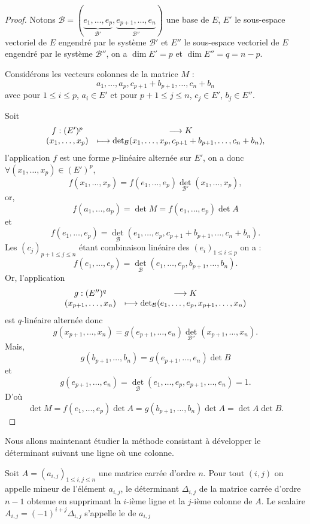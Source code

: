 \documentclass[class=report,crop=false]{standalone}
\begin{document}
\begin{proof}
Notons $\mathcal{B}=(\underbrace{e_1,\dots,e_p}_{\mathcal{B}'},\underbrace{e_{p+1},\dots,e_n}_{\mathcal{B}''})$ une base de $E$, $E'$ le sous-espace vectoriel de $E$ engendré par le système $\mathcal{B}'$ et $E''$ le sous-espace vectoriel de $E$ engendré par le système $\mathcal{B}''$, on a $\dim E'=p$ et $\dim E''=q=n-p$.

Considérons les vecteurs colonnes de la matrice $M$ :
$$a_1,\dots,a_p,c_{p+1}+b_{p+1},\dots,c_n+b_n$$ 
avec pour $1\leq i\leq p$, $a_i\in E'$ et pour $p+1\leq j\leq n$, $c_j\in E'$, $b_j\in E''$.

Soit $$\begin{array}{cc}f:(E')^p&\longrightarrow K\cr (x_1,\dots,x_p)&\longmapsto\det_\mathcal{B}(x_1,\dots,x_p,c_{p+1}+b_{p+1},\dots,c_n+b_n),\end{array}$$
l'application $f$ est une forme $p$-linéaire alternée sur $E'$, on a donc $\forall(x_1,\dots,x_p)\in (E')^p$,
$$f(x_1,\dots,x_p)=f(e_1,\dots,e_p)\det_{\mathcal{B}'}(x_1,\dots,x_p),$$
or,
$$f(a_1,\dots,a_p)=\det M=f(e_1,\dots,e_p)\det A$$ et
$$f(e_1,\dots,e_p)=\det_\mathcal{B}(e_1,\dots,e_p,c_{p+1}+b_{p+1},\dots,c_n+b_n).$$
Les $(c_j)_{p+1\leq j\leq n}$ étant combinaison linéaire des $(e_i)_{1\leq i\leq p}$ on a :
$$f(e_1,\dots,e_p)=\det_\mathcal{B}(e_1,\dots,e_p,b_{p+1},\dots,b_n).$$
Or, l'application
$$\begin{array}{cc}g:(E'')^q&\longrightarrow K\cr (x_{p+1},\dots,x_n)&\longmapsto\det_\mathcal{B}(e_1,\dots,e_p,x_{p+1},\dots,x_n)\end{array}$$
est $q$-linéaire alternée donc
$$g(x_{p+1},\dots,x_n)=g(e_{p+1},\dots,e_n)\det_{\mathcal{B}''}(x_{p+1},\dots,x_n).$$
Mais,
$$g(b_{p+1},\dots,b_n)=g(e_{p+1},\dots,e_n)\det B$$
et
$$g(e_{p+1},\dots,e_n)=\det_\mathcal{B}(e_1,\dots,e_p,e_{p+1},\dots,e_n)=1.$$
D'où 
$$\det M= f(e_1,\dots,e_p)\det A=g(b_{p+1},\dots,b_n)\det A=\det A\det B.$$
\end{proof}



Nous allons maintenant étudier la méthode consistant à développer 
le déterminant suivant une ligne où une colonne.

\begin{definition}
Soit $A=(a_{i,j})_{1\leq i,j\leq n}$ une matrice carrée d'ordre $n$. Pour tout $(i,j)$
on appelle {\rm mineur} de l'élément $a_{i,j}$, le déterminant $\Delta_{i,j}$ 
de la matrice carrée d'ordre
$n-1$ obtenue en supprimant la $i$-ième ligne et la $j$-ième colonne de $A$. Le scalaire 
$A_{i,j}=(-1)^{i+j}\Delta_{i,j}$ s'appelle le  de $a_{i,j}$  
\end{definition}
 
\end{document}
